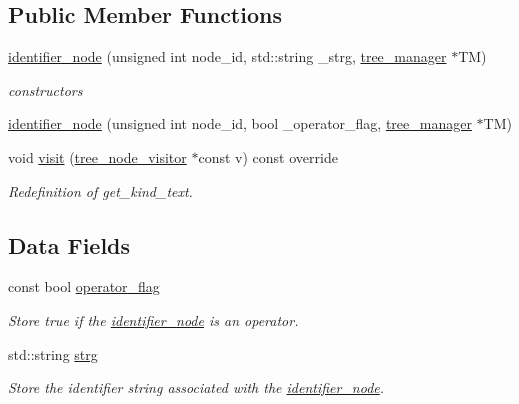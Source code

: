 \subsection*{Public Member Functions}
\begin{DoxyCompactItemize}
\item 
\hyperlink{structidentifier__node_a8e3b4af31cd20552bf425dcdd680baa3}{identifier\+\_\+node} (unsigned int node\+\_\+id, std\+::string \+\_\+strg, \hyperlink{classtree__manager}{tree\+\_\+manager} $\ast$TM)
\begin{DoxyCompactList}\small\item\em constructors \end{DoxyCompactList}\item 
\hyperlink{structidentifier__node_af553785f7955ed859280854c953cdd21}{identifier\+\_\+node} (unsigned int node\+\_\+id, bool \+\_\+operator\+\_\+flag, \hyperlink{classtree__manager}{tree\+\_\+manager} $\ast$TM)
\item 
void \hyperlink{structidentifier__node_ada49ca74d47b1db6e1dfa69a1a46d597}{visit} (\hyperlink{classtree__node__visitor}{tree\+\_\+node\+\_\+visitor} $\ast$const v) const override
\begin{DoxyCompactList}\small\item\em Redefinition of get\+\_\+kind\+\_\+text. \end{DoxyCompactList}\end{DoxyCompactItemize}
\subsection*{Data Fields}
\begin{DoxyCompactItemize}
\item 
const bool \hyperlink{structidentifier__node_adab51691a41773a12f4aa9112203256f}{operator\+\_\+flag}
\begin{DoxyCompactList}\small\item\em Store true if the \hyperlink{structidentifier__node}{identifier\+\_\+node} is an operator. \end{DoxyCompactList}\item 
std\+::string \hyperlink{structidentifier__node_a23c998343d286f11865313bdd39c4fcb}{strg}
\begin{DoxyCompactList}\small\item\em Store the identifier string associated with the \hyperlink{structidentifier__node}{identifier\+\_\+node}. \end{DoxyCompactList}\end{DoxyCompactItemize}
